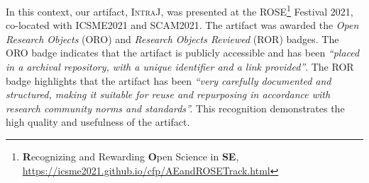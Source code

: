 In this context, our artifact, \textsc{IntraJ}, was presented at the
ROSE\footnote{\textbf{R}ecognizing and Rewarding \textbf{O}pen Science in \textbf{SE},
\url{https://icsme2021.github.io/cfp/AEandROSETrack.html}} Festival 2021,
co-located with ICSME2021 and SCAM2021. The artifact was awarded the \emph{Open Research Objects}
(ORO) and \emph{Research Objects Reviewed} (ROR) badges.
The ORO badge indicates that the artifact is publicly accessible and has been
\emph{``placed in a archival repository, with a unique identifier and a link provided''}.
The ROR badge highlights that the artifact has been
\emph{``very carefully documented and structured, making it suitable for reuse and repurposing
in accordance with research community norms and standards''.} This recognition
demonstrates the high quality and usefulness of the artifact.

